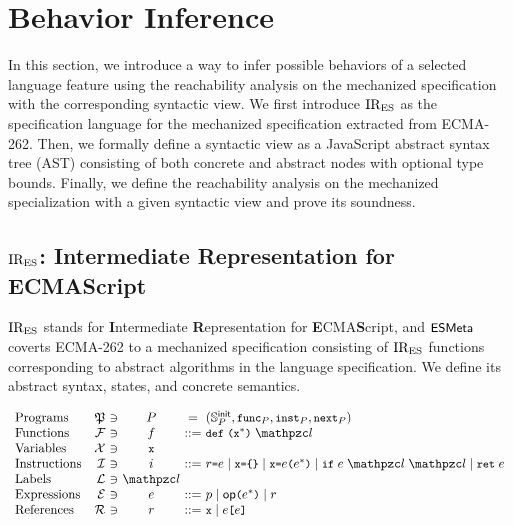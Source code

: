 \section{Behavior Inference}\label{sec:infer}

In this section, we introduce a way to infer possible behaviors of a selected
language feature using the reachability analysis on the mechanized specification
with the corresponding syntactic view.  We first introduce $\text{IR}_\text{ES}$ as the
specification language for the mechanized specification extracted from ECMA-262.
Then, we formally define a syntactic view as a JavaScript abstract syntax tree
(AST) consisting of both concrete and abstract nodes with optional type bounds.
Finally, we define the reachability analysis on the mechanized specialization
with a given syntactic view and prove its soundness.

\subsection{$\text{IR}_\text{ES}$: Intermediate Representation for ECMAScript}

$\text{IR}_\text{ES}$ stands for \textbf{I}ntermediate \textbf{R}epresentation for
\textbf{E}CMA\textbf{S}cript, and $\textsf{\small ESMeta}$ coverts ECMA-262 to a mechanized
specification consisting of $\text{IR}_\text{ES}$ functions corresponding to abstract
algorithms in the language specification.  We define its abstract syntax,
states, and concrete semantics.

\[
  \begin{array}{lr@{~}c@{~}c@{~}c@{~}l}
    \text{Programs} & \progset &\ni& \prog &=& (\initstset{\prog},
    \getfunc{\prog}, \getinst{\prog}, \getnext{\prog})\\

    \text{Functions} & \funcset &\ni& \func &::=&
    \kwdef \; \kwrl \varx^* \kwrr \; \lab\\

    \text{Variables} & \varset &\ni& \varx\\

    \text{Instructions} & \instset &\ni& \inst &::=&
    \refer \kweq \expr \mid
    \varx \kweq \kwcl \kwcr \mid
    \varx \kweq \expr \kwrl \expr^* \kwrr \mid
    \kwif \; \expr \; \lab \; \lab \mid
    \kwret \; \expr\\

    \text{Labels} & \labset &\ni& \lab\\

    \text{Expressions} & \exprset &\ni& \expr &::=&
    \pval \mid
    \op \kwrl \expr^* \kwrr \mid
    \refer\\

    \text{References} & \referset &\ni& \refer &::=&
    \varx \mid \expr \kwsl \expr \kwsr\\
  \end{array}
\]

